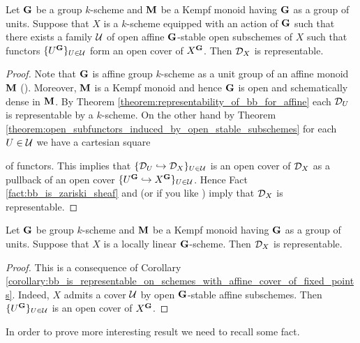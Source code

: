 \begin{corollary}\label{corollary:bb_is_representable_on_schemes_with_affine_cover_of_fixed_points}
Let $\mathbf{G}$ be a group $k$-scheme and $\mathbf{M}$ be a Kempf monoid having $\mathbf{G}$ as a group of units. Suppose that $X$ is a $k$-scheme equipped with an action of $\mathbf{G}$ such that there exists a family ${\mathcal U}$ of open affine $\mathbf{G}$-stable open subschemes of $X$ such that functors $\{U^{\mathbf{G}}\}_{U \in {\mathcal U}}$ form an open cover of $X^{\mathbf{G}}$. Then ${\mathcal D}_X$ is representable.
\end{corollary}
\begin{proof}
Note that $\mathbf{G}$ is affine group $k$-scheme as a unit group of an affine monoid $\mathbf{M}$ ({\cite[Proposition 12.4]{Monoid_k_functors}}). Moreover, $\mathbf{M}$ is a Kempf monoid and hence $\mathbf{G}$ is open and schematically dense in $\mathbf{M}$. By Theorem \ref{theorem:representability_of_bb_for_affine} each ${\mathcal D}_U$ is representable by a $k$-scheme. On the other hand by Theorem \ref{theorem:open_subfunctors_induced_by_open_stable_subschemes} for each $U\in {\mathcal U}$ we have a cartesian square
\begin{center}
\end{center}
of functors. This implies that $\{{\mathcal D}_U\hookrightarrow {\mathcal D}_X\}_{U\in {\mathcal U}}$ is an open cover of ${\mathcal D}_X$ as a pullback of an open cover $\{U^{\mathbf{G}}\hookrightarrow X^{\mathbf{G}}\}_{U\in {\mathcal U}}$. Hence Fact \ref{fact:bb_is_zariski_sheaf} and {\cite[Theorem 8.9]{gortz2010algebraic}} (or if you like {\cite[Theorem 4.6]{kfunctors}}) imply that ${\mathcal D}_X$ is representable. 
\end{proof}

\begin{corollary}\label{corollary:bb_is_representable_on_locally_linear_schemes}
Let $\mathbf{G}$ be group $k$-scheme and $\mathbf{M}$ be a Kempf monoid having $\mathbf{G}$ as a group of units. Suppose that $X$ is a locally linear $\mathbf{G}$-scheme. Then ${\mathcal D}_X$ is representable.
\end{corollary}
\begin{proof}
This is a consequence of Corollary \ref{corollary:bb_is_representable_on_schemes_with_affine_cover_of_fixed_points}. Indeed, $X$ admits a cover ${\mathcal U}$ by open $\mathbf{G}$-stable affine subschemes. Then $\{U^{\mathbf{G}}\}_{U\in {\mathcal U}}$ is an open cover of $X^{\mathbf{G}}$.
\end{proof}
\noindent
In order to prove more interesting result we need to recall some fact.

